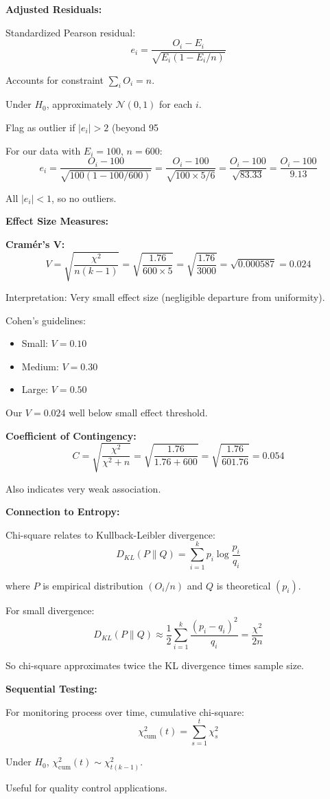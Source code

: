 \documentclass[12pt]{article}
\begin{document}
\begin{explanation}
\textbf{Adjusted Residuals:}

Standardized Pearson residual:
\[
e_i = \frac{O_i - E_i}{\sqrt{E_i(1 - E_i/n)}}
\]

Accounts for constraint $\sum_i O_i = n$.

Under $H_0$, approximately $\mathcal{N}(0, 1)$ for each $i$.

Flag as outlier if $|e_i| > 2$ (beyond 95%

For our data with $E_i = 100$, $n = 600$:
\[
e_i = \frac{O_i - 100}{\sqrt{100(1 - 100/600)}} = \frac{O_i - 100}{\sqrt{100 \times 5/6}} = \frac{O_i - 100}{\sqrt{83.33}} = \frac{O_i - 100}{9.13}
\]

All $|e_i| < 1$, so no outliers.

\textbf{Effect Size Measures:}

\textbf{Cramér's V:}
\[
V = \sqrt{\frac{\chi^2}{n(k-1)}} = \sqrt{\frac{1.76}{600 \times 5}} = \sqrt{\frac{1.76}{3000}} = \sqrt{0.000587} = 0.024
\]

Interpretation: Very small effect size (negligible departure from uniformity).

Cohen's guidelines:
\begin{itemize}
    \item Small: $V = 0.10$
    \item Medium: $V = 0.30$
    \item Large: $V = 0.50$
\end{itemize}

Our $V = 0.024$ well below small effect threshold.

\textbf{Coefficient of Contingency:}
\[
C = \sqrt{\frac{\chi^2}{\chi^2 + n}} = \sqrt{\frac{1.76}{1.76 + 600}} = \sqrt{\frac{1.76}{601.76}} = 0.054
\]

Also indicates very weak association.

\textbf{Connection to Entropy:}

Chi-square relates to Kullback-Leibler divergence:
\[
D_{KL}(P \| Q) = \sum_{i=1}^k p_i\log\frac{p_i}{q_i}
\]

where $P$ is empirical distribution $(O_i/n)$ and $Q$ is theoretical $(p_i)$.

For small divergence:
\[
D_{KL}(P \| Q) \approx \frac{1}{2}\sum_{i=1}^k \frac{(p_i - q_i)^2}{q_i} = \frac{\chi^2}{2n}
\]

So chi-square approximates twice the KL divergence times sample size.

\textbf{Sequential Testing:}

For monitoring process over time, cumulative chi-square:
\[
\chi^2_{\text{cum}}(t) = \sum_{s=1}^t \chi^2_s
\]

Under $H_0$, $\chi^2_{\text{cum}}(t) \sim \chi^2_{t(k-1)}$.

Useful for quality control applications.

\end{explanation}
\end{document}
